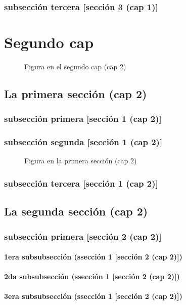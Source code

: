 \documentclass[12pt,a4paper]{report}
\begin{document}
\subsection{subsección tercera [sección 3 (cap 1)]}

\chapter{Segundo cap}
\begin{figure}[H]
\caption{Figura en el segundo cap (cap 2)}
\end{figure}
\section{La primera sección (cap 2)}
\subsection{subsección primera [sección 1 (cap 2)]}
\subsection{subsección segunda [sección 1 (cap 2)]}
\begin{figure}[H]
\caption{Figura en la primera sección (cap 2)}
\end{figure}
\subsection{subsección tercera [sección 1 (cap 2)]}
\section{La segunda sección (cap 2)}
\subsection{subsección primera [sección 2 (cap 2)]}
\subsubsection{1era subsubsección (ssección 1 [sección 2 (cap 2)])}
\subsubsection{2da subsubsección (ssección 1 [sección 2 (cap 2)])}
\subsubsection{3era subsubsección (ssección 1 [sección 2 (cap 2)])}
\end{document}
